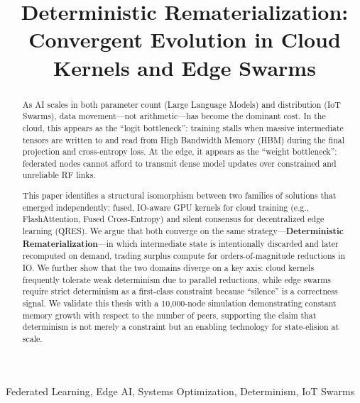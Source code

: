 \documentclass[conference]{IEEEtran}
\begin{document}
\title{Deterministic Rematerialization: Convergent Evolution in Cloud Kernels and Edge Swarms}

\author{
}

\maketitle
\thispagestyle{firstpage}

\begin{abstract}
As AI scales in both parameter count (Large Language Models) and distribution (IoT Swarms), data movement---not arithmetic---has become the dominant cost. In the cloud, this appears as the ``logit bottleneck'': training stalls when massive intermediate tensors are written to and read from High Bandwidth Memory (HBM) during the final projection and cross-entropy loss. At the edge, it appears as the ``weight bottleneck'': federated nodes cannot afford to transmit dense model updates over constrained and unreliable RF links.

This paper identifies a structural isomorphism between two families of solutions that emerged independently: fused, IO-aware GPU kernels for cloud training (e.g., FlashAttention, Fused Cross-Entropy) and silent consensus for decentralized edge learning (QRES). We argue that both converge on the same strategy---\textbf{Deterministic Rematerialization}---in which intermediate state is intentionally discarded and later recomputed on demand, trading surplus compute for orders-of-magnitude reductions in IO. We further show that the two domains diverge on a key axis: cloud kernels frequently tolerate weak determinism due to parallel reductions, while edge swarms require strict determinism as a first-class constraint because ``silence'' is a correctness signal. We validate this thesis with a 10,000-node simulation demonstrating constant memory growth with respect to the number of peers, supporting the claim that determinism is not merely a constraint but an enabling technology for state-elision at scale.
\end{abstract}

\begin{IEEEkeywords}
Federated Learning, Edge AI, Systems Optimization, Determinism, IoT Swarms
\end{IEEEkeywords}
\end{document}
